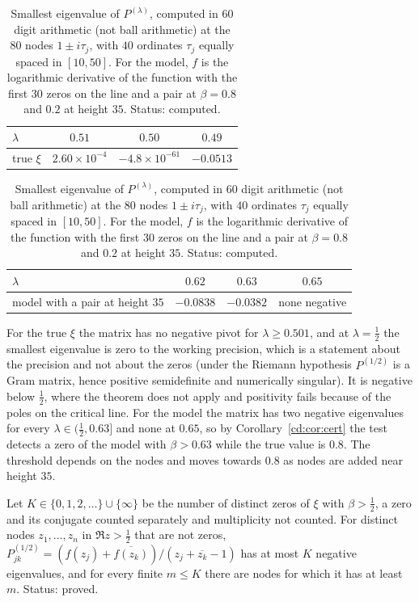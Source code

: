 \begin{table}[ht]
\centering
\caption{Smallest eigenvalue of $P^{(\lambda)}$, computed in $60$ digit arithmetic (not ball arithmetic) at the $80$ nodes $1\pm i\tau_j$, with $40$ ordinates $\tau_j$ equally spaced in $[10,50]$. For the model, $f$ is the logarithmic derivative of the function with the first $30$ zeros on the line and a pair at $\beta=0.8$ and $0.2$ at height $35$. Status: computed.}\label{cd:tab:pick}
\begin{tabular}{lccc}
\toprule
$\lambda$ & $0.51$ & $0.50$ & $0.49$\\
\midrule
true $\xi$ & $2.60\times10^{-4}$ & $-4.8\times10^{-61}$ & $-0.0513$\\
\bottomrule
\end{tabular}

\medskip
\begin{tabular}{lccc}
\toprule
$\lambda$ & $0.62$ & $0.63$ & $0.65$\\
\midrule
model with a pair at height $35$ & $-0.0838$ & $-0.0382$ & none negative\\
\bottomrule
\end{tabular}
\end{table}

For the true $\xi$ the matrix has no negative pivot for $\lambda\ge0.501$, and at $\lambda=\tfrac12$ the smallest eigenvalue is zero to the working precision, which is a statement about the precision and not about the zeros (under the Riemann hypothesis $P^{(1/2)}$ is a Gram matrix, hence positive semidefinite and numerically singular). It is negative below $\tfrac12$, where the theorem does not apply and positivity fails because of the poles on the critical line. For the model the matrix has two negative eigenvalues for every $\lambda\in(\tfrac12,0.63]$ and none at $0.65$, so by Corollary~\ref{cd:cor:cert} the test detects a zero of the model with $\beta>0.63$ while the true value is $0.8$. The threshold depends on the nodes and moves towards $0.8$ as nodes are added near height $35$.

\begin{proposition}\label{cd:prop:negsq}
Let $K\in\{0,1,2,\dots\}\cup\{\infty\}$ be the number of distinct zeros of $\xi$ with $\beta>\tfrac12$, a zero and its conjugate counted separately and multiplicity not counted. For distinct nodes $z_1,\dots,z_n$ in $\Re z>\tfrac12$ that are not zeros, $P^{(1/2)}_{jk}=(f(z_j)+\overline{f(z_k)})/(z_j+\overline{z_k}-1)$ has at most $K$ negative eigenvalues, and for every finite $m\le K$ there are nodes for which it has at least $m$. Status: proved.
\end{proposition}

